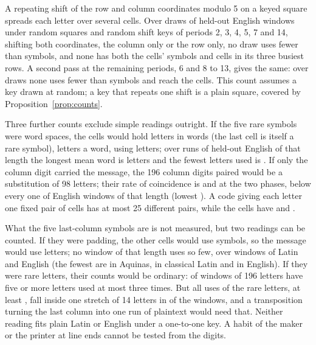 \documentclass[11pt]{article}
\theoremstyle{definition}
\begin{document}
A repeating shift of the row and column coordinates modulo 5 on a keyed square spreads each letter over several cells. Over \addDraws{} draws of held-out English windows under random squares and random shift keys of periods 2, 3, 4, 5, 7 and 14, shifting both coordinates, the column only or the row only, no draw uses fewer than \addFewest{} symbols, and none has both the cells' \cellsDistinct{} symbols and \addTopRows{} cells in its three busiest rows. A second pass at the remaining periods, 6 and 8 to 13, gives the same: over \sgEnDraws{} draws none uses fewer than \sgEnFewest{} symbols and \sgEnReaching{} reach the cells. This count assumes a key drawn at random; a key that repeats one shift is a plain square, covered by Proposition~\ref{prop:counts}.

Three further counts exclude simple readings outright. If the five rare symbols were word spaces, the cells would hold \spacesLetters{} letters in \spacesWords{} words (the last cell is itself a rare symbol), \spacesMean{} letters a word, using \spacesDistinct{} letters; over \spacesRuns{} runs of held-out English of that length the longest mean word is \spacesEnglishMax{} letters and the fewest letters used is \spacesEnglishFewest{}. If only the column digit carried the message, the 196 column digits paired would be a substitution of 98 letters; their rate of coincidence is \coincidenceA{} and \coincidenceB{} at the two phases, below every one of \coincidenceWindows{} English windows of that length (lowest \coincidenceEnglishLow{}). A code giving each letter one fixed pair of cells has at most 25 different pairs, while the cells have \pairCellsA{} and \pairCellsB{}.

What the five last-column symbols are is not measured, but two readings can be counted. If they were padding, the other \rcCellsRest{} cells would use \rcSymbolsRest{} symbols, so the message would use \rcSymbolsRest{} letters; no window of that length uses so few, over \rcPadWindows{} windows of Latin and English (the fewest are \rcLatinFewest{} in Aquinas, \rcClassicalFewest{} in classical Latin and \rcEnglishFewest{} in English). If they were rare letters, their counts would be ordinary: \rcRareEnough{} of \rcRareWindows{} windows of 196 letters have five or more letters used at most three times. But all uses of the rare letters, at least \rcPrivateCells{}, fall inside one stretch of 14 letters in \rcPacked{} of the \rcRareWindows{} windows, and a transposition turning the last column into one run of plaintext would need that. Neither reading fits plain Latin or English under a one-to-one key. A habit of the maker or the printer at line ends cannot be tested from the digits.
\end{document}

